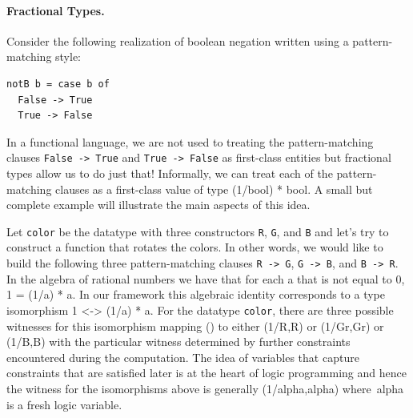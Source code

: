 \documentclass[preprint]{sigplanconf}
\begin{document}
\paragraph*{Fractional Types.} 
Consider the following realization of boolean negation written using a
pattern-matching style:
\begin{verbatim}
notB b = case b of 
  False -> True
  True -> False
\end{verbatim}
In a functional language, we are not used to treating the pattern-matching
clauses \verb|False -> True| and \verb|True -> False| as first-class entities
but fractional types allow us to do just that! Informally, we can treat each
of the pattern-matching clauses as a first-class value of type 
{{(1/bool) * bool}}. 
A small but complete example will illustrate the main aspects of this idea.

Let \verb|color| be the datatype with three constructors \verb|R|, \verb|G|,
and \verb|B| and let's try to construct a function that rotates the
colors. In other words, we would like to build the following three
pattern-matching clauses \verb|R -> G|, \verb|G -> B|, and \verb|B -> R|.  In
the algebra of rational numbers we have that for each {{a}} that is not equal
to {{0}}, {{1 = (1/a) * a}}. In our framework this algebraic identity
corresponds to a type isomorphism {{1 <-> (1/a) * a}}. For the datatype
\verb|color|, there are three possible witnesses for this isomorphism mapping
{{()}} to either {{(1/R,R)}} or {{(1/Gr,Gr)}} or {{(1/B,B)}} with the
particular witness determined by further constraints encountered during the
computation. The idea of variables that capture constraints that are
satisfied later is at the heart of logic programming and hence the witness for
the isomorphisms above is generally {{(1/alpha,alpha)}} where~{{alpha}} is a
fresh logic variable. 
\end{document}
